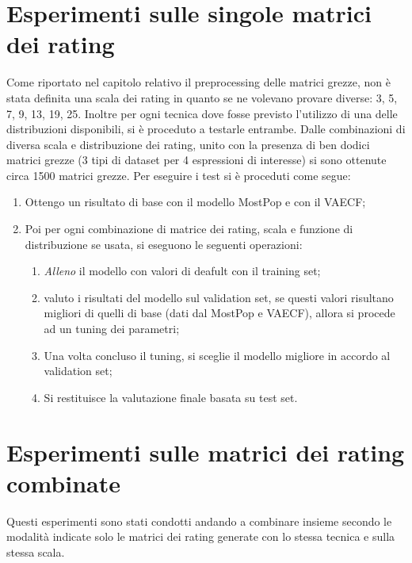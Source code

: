 \section{Esperimenti sulle singole matrici dei rating}
Come riportato nel capitolo relativo il preprocessing delle matrici grezze, non è stata definita una scala dei rating in quanto se ne volevano provare diverse: 3, 5, 7, 9, 13, 19, 25.
Inoltre per ogni tecnica dove fosse previsto l'utilizzo di una delle distribuzioni disponibili, si è proceduto a testarle entrambe.
Dalle combinazioni di diversa scala e distribuzione dei rating, unito con la presenza di ben dodici matrici grezze (3 tipi di dataset per 4 espressioni di interesse) si sono ottenute circa 1500 matrici grezze.
Per eseguire i test si è proceduti come segue:
\begin{enumerate}
    \item Ottengo un risultato di base con il modello MostPop e con il VAECF;
    \item Poi per ogni combinazione di matrice dei rating, scala e funzione di distribuzione se usata, si eseguono le seguenti operazioni:
    \begin{enumerate}
        \item \textit{Alleno} il modello con valori di deafult con il training set;
        \item valuto i risultati del modello sul validation set, se questi valori risultano migliori di quelli di base (dati dal MostPop e VAECF), allora si procede ad un tuning dei parametri;
        \item Una volta concluso il tuning, si sceglie il modello migliore in accordo al validation set;
        \item Si restituisce la valutazione finale basata su test set.
    \end{enumerate}
\end{enumerate}

\section{Esperimenti sulle matrici dei rating combinate}
Questi esperimenti sono stati condotti andando a combinare insieme secondo le modalità indicate solo le matrici dei rating generate con lo stessa tecnica e sulla stessa scala.
